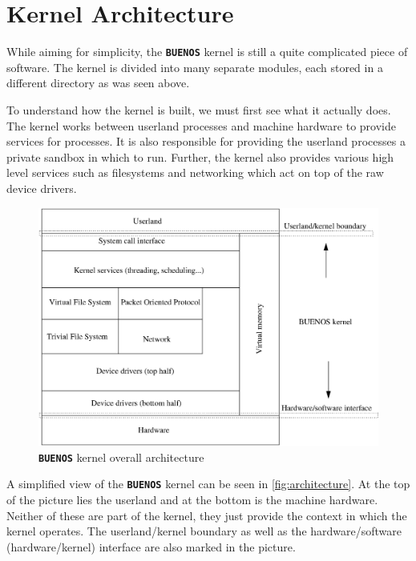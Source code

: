 \documentclass[twoside,a4paper]{report}
\newlength{\tablewidth}
\newcommand{\buenos}{\texttt{\textbf{BUENOS}}}
\begin{document}
\section{Kernel Architecture}

While aiming for simplicity, the \buenos{} kernel is still a quite
complicated piece of software. The kernel is divided into many
separate modules, each stored in a different directory as was
seen above.

To understand how the kernel is built, we must first see what it
actually does. The kernel works between userland processes and machine
hardware to provide services for processes. It is also responsible for
providing the userland processes a private sandbox in which to run. Further,
the kernel also provides various high level services such as
filesystems and networking which act on top of the raw device drivers.

\begin{figure}
\begin{center}
\includegraphics[width=\tablewidth,angle=0]{pics/architecture.eps}
\caption{\buenos{} kernel overall architecture}
\label{fig:architecture}
\end{center}
\end{figure}

 
A simplified view of the \buenos{} kernel can be seen in
\autoref{fig:architecture}. At the top of the picture lies the
userland and at the bottom is the machine hardware. Neither of these
are part of the kernel, they just provide the context in which the
kernel operates. The userland/kernel boundary as well as the
hardware/software (hardware/kernel) interface are also marked in the
picture.
\end{document}
